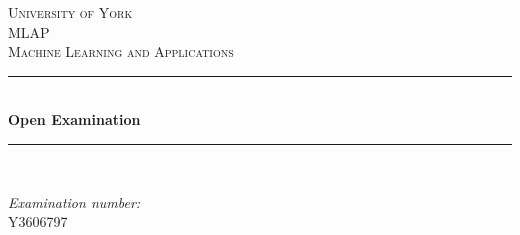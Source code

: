 \documentclass[12pt]{article} %
\begin{document}

\begin{titlepage}

\newcommand{\HRule}{\rule{\linewidth}{0.5mm}} %

\center %

\textsc{\LARGE University of York}\\[1.5cm] %
\textsc{\Large MLAP}\\[0.5cm] %
\textsc{\large Machine Learning and Applications}\\[0.5cm] %

\HRule \\[0.4cm]
{ \huge \bfseries Open Examination}\\[0.4cm] %
\HRule \\[1.5cm]

\begin{minipage}{0.4\textwidth}
\begin{flushleft} \large
\center \emph{Examination number:}\\
\center Y3606797
\end{flushleft}
\end{minipage}


\vfill %

\end{titlepage}


\tableofcontents %

\newpage %

\end{document}
